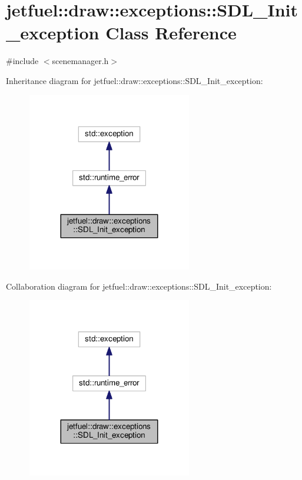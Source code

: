 \hypertarget{classjetfuel_1_1draw_1_1exceptions_1_1SDL__Init__exception}{}\section{jetfuel\+:\+:draw\+:\+:exceptions\+:\+:S\+D\+L\+\_\+\+Init\+\_\+exception Class Reference}
\label{classjetfuel_1_1draw_1_1exceptions_1_1SDL__Init__exception}


{\ttfamily \#include $<$scenemanager.\+h$>$}



Inheritance diagram for jetfuel\+:\+:draw\+:\+:exceptions\+:\+:S\+D\+L\+\_\+\+Init\+\_\+exception\+:
\nopagebreak
\begin{figure}[H]
\begin{center}
\leavevmode
\includegraphics[width=203pt]{classjetfuel_1_1draw_1_1exceptions_1_1SDL__Init__exception__inherit__graph}
\end{center}
\end{figure}


Collaboration diagram for jetfuel\+:\+:draw\+:\+:exceptions\+:\+:S\+D\+L\+\_\+\+Init\+\_\+exception\+:
\nopagebreak
\begin{figure}[H]
\begin{center}
\leavevmode
\includegraphics[width=203pt]{classjetfuel_1_1draw_1_1exceptions_1_1SDL__Init__exception__coll__graph}
\end{center}
\end{figure}
